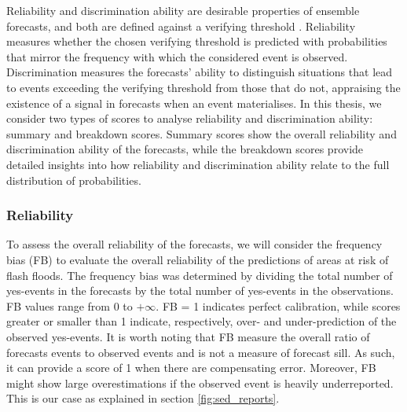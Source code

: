 Reliability and discrimination ability are desirable properties of ensemble forecasts, and both are defined against a verifying threshold \citep{Jolliffe_2012, Wilks_2020}. Reliability measures whether the chosen verifying threshold is predicted with probabilities that mirror the frequency with which the considered event is observed. Discrimination measures the forecasts' ability to distinguish situations that lead to events exceeding the verifying threshold from those that do not, appraising the existence of a signal in forecasts when an event materialises. In this thesis, we consider two types of scores to analyse reliability and discrimination ability: summary and breakdown scores. Summary scores show the overall reliability and discrimination ability of the forecasts, while the breakdown scores provide detailed insights into how reliability and discrimination ability relate to the full distribution of probabilities. 


\subsubsection{Reliability}

To assess the overall reliability of the forecasts, we will consider the frequency bias (FB) to evaluate the overall reliability of the predictions of areas at risk of flash floods. The frequency bias was determined by dividing the total number of yes-events in the forecasts by the total number of yes-events in the observations. FB values range from 0 to $+\infty$. FB = 1 indicates perfect calibration, while scores greater or smaller than 1 indicate, respectively, over- and under-prediction of the observed yes-events. It is worth noting that FB measure the overall ratio of forecasts events to observed events and is not a measure of forecast sill. As such, it can provide a score of 1 when there are compensating error. Moreover, FB might show large overestimations if the observed event is heavily underreported. This is our case as explained in section \ref{fig:sed_reports}.

